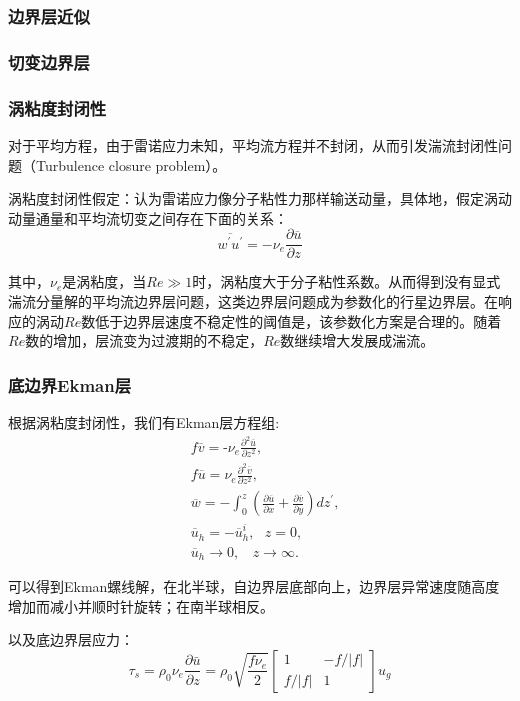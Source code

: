 \documentclass{article}
\begin{document}
\subsubsection{边界层近似}
\subsubsection{切变边界层}
\subsubsection{涡粘度封闭性}
对于平均方程，由于雷诺应力未知，平均流方程并不封闭，从而引发湍流封闭性问题（Turbulence closure problem）。

涡粘度封闭性假定：认为雷诺应力像分子粘性力那样输送动量，具体地，假定涡动动量通量和平均流切变之间存在下面的关系：
$$\overline{{w}^{\prime}{u}^{\prime}}=-{{\nu }_{e}}\frac{\partial \overline{u}}{\partial z}$$

其中，${\nu }_{e}$是涡粘度，当$Re \gg 1$时，涡粘度大于分子粘性系数。从而得到没有显式湍流分量解的平均流边界层问题，这类边界层问题成为参数化的行星边界层。在响应的涡动$Re$数低于边界层速度不稳定性的阈值是，该参数化方案是合理的。随着$Re$数的增加，层流变为过渡期的不稳定，$Re$数继续增大发展成湍流。

\subsubsection{底边界Ekman层}
根据涡粘度封闭性，我们有Ekman层方程组:
\begin{align}
  & f\overline{v}=\text{-}{{\nu }_{e}}\frac{{{\partial }^{2}}\overline{u}}{\partial {{z}^{2}}}, \\ 
 & f\overline{u}={{\nu }_{e}}\frac{{{\partial }^{2}}\overline{v}}{\partial {{z}^{2}}}, \\ 
 & \overline{w}=-\int_{0}^{z}{(\frac{\partial \overline{u}}{\partial x}+\frac{\partial \overline{v}}{\partial y})}d{z}^{\prime}, \\ 
 & {{\overline{u}}_{h}}=-\overline{u}_{h}^{i},\ \ \ z=0, \\ 
 & {{\overline{u}}_{h}}\to 0,\ \ \ \ z\to \infty .\ \ \ \  
\end{align}

可以得到Ekman螺线解，在北半球，自边界层底部向上，边界层异常速度随高度增加而减小并顺时针旋转；在南半球相反。

以及底边界层应力：
$$\tau_s=\rho_0\nu_e\frac{\partial\bar{u}}{\partial z}=\rho_0\sqrt{\frac{f\nu_e}{2}}\begin{bmatrix}
    1&-f/|f|\\
    f/|f|& 1
\end{bmatrix}u_g$$
\end{document}
